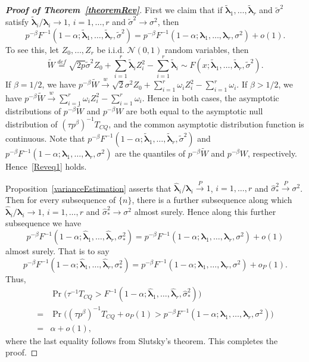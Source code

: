 \documentclass[times,sort&compress,3p]{elsarticle}
\newcommand{\bfsym}[1]{\ensuremath{\boldsymbol{#1}}}
\def\blambda {\bfsym {\lambda}}        \def\bLambda {\bfsym {\Lambda}}
\theoremstyle{plain}
\theoremstyle{definition}
\theoremstyle{remark}
\begin{document}
\begin{appendices}
\begin{proof}[\textbf{Proof of Theorem~\ref{theoremRev}}]
    First we claim that if $\tilde{\blambda}_1,\ldots, \tilde{\blambda}_r$ and $\tilde{\sigma}^2$ satisfy $\tilde{\blambda}_i/\blambda_i\to 1$, $i=1,\ldots,r$ and $\tilde{\sigma}^2\to \sigma^2$, then
    \begin{equation}\label{Reveq1}
        p^{-\beta}F^{-1}(1-\alpha;\tilde{\blambda}_1,\ldots,\tilde{\blambda}_r,\tilde{\sigma}^2)=
        p^{-\beta}F^{-1}(1-\alpha;\blambda_1,\ldots,\blambda_r,\sigma^2)+o(1).
    \end{equation}
    To see this, let $Z_0,\ldots, Z_r$ be i.i.d. $\mathcal{N}(0,1)$ random variables, then
    $$
    \tilde{W}\overset{def}{=}\sqrt{2p}\tilde{\sigma}^2 Z_0
+
        \sum_{i=1}^r \tilde{\blambda}_i Z_i^2
            -
        \sum_{i=1}^r \tilde{\blambda}_i\sim F(x;\tilde{\blambda}_1,\ldots,\tilde{\blambda}_r,\tilde{\sigma}^2).
    $$
If $\beta=1/2$, we have
$
    p^{-\beta}\tilde{W}\xrightarrow{w}
\sqrt{2}\sigma^2 Z_0 + \sum_{i=1}^r \omega_i Z_i^2 -\sum_{i=1}^r \omega_i
$.
If $\beta>1/2$, we have
$
    p^{-\beta}\tilde{W}\xrightarrow{w}
\sum_{i=1}^r \omega_i Z_i^2 -\sum_{i=1}^r \omega_i.
$
    Hence in both cases, the asymptotic distributions of $p^{-\beta}\tilde{W}$ and $p^{-\beta}W$ are both equal to the asymptotic null distribution of $(\tau p^{\beta})^{-1}T_{CQ}$, and the common asymptotic distribution function is continuous.
Note that
$
        p^{-\beta}F^{-1}(1-\alpha;\tilde{\blambda}_1,\ldots,\tilde{\blambda}_r,\tilde{\sigma}^2)
    $
     and
$
        p^{-\beta}F^{-1}(1-\alpha;\blambda_1,\ldots,\blambda_r,\sigma^2)
    $
    are the quantiles of $p^{-\beta}\tilde{W}$ and $p^{-\beta}W$, respectively.
    Hence~\eqref{Reveq1} holds. 
    
    Proposition~\ref{varianceEstimation} asserts that $\hat{\blambda}_i/\blambda_i\xrightarrow{P} 1$, $i=1,\ldots,r$ and $\hat{\sigma}_*^2\xrightarrow{P} \sigma^2$.
    Then for every subsequence of $\{n\}$, there is a further subsequence along which $\hat{\blambda}_i/\blambda_i\to 1$, $i=1,\ldots,r$ and $\hat{\sigma}_*^2\to \sigma^2$ almost surely.
    Hence along this further subsequence we have
    $$
        p^{-\beta}F^{-1}(1-\alpha;\hat{\blambda}_1,\ldots,\hat{\blambda}_r,\sigma_{*}^2)=
        p^{-\beta}F^{-1}(1-\alpha;\blambda_1,\ldots,\blambda_r,\sigma^2)+o(1)
    $$
    almost surely.
    That is to say
    $$
        p^{-\beta}F^{-1}(1-\alpha;\hat{\blambda}_1,\ldots,\hat{\blambda}_r,\sigma_{*}^2)=
        p^{-\beta}F^{-1}(1-\alpha;\blambda_1,\ldots,\blambda_r,\sigma^2)+o_P(1).
    $$
    Thus,
    $$
    \begin{aligned}
        &\Pr\big(\tau^{-1}T_{CQ} > F^{-1}(1-\alpha;\hat{\blambda}_1,\ldots,\hat{\blambda}_r,\hat{\sigma}_*^2)\big)
        \\
        =&
    \Pr\big((\tau p^{\beta})^{-1}T_{CQ} +o_P(1) > p^{-\beta}F^{-1}(1-\alpha;\blambda_1,\ldots,\blambda_r,\sigma^2)\big)
        \\
        =& \alpha +o(1),
    \end{aligned}
    $$
    where the last equality follows from Slutsky's theorem.
    This completes the proof.
\end{proof}





\end{appendices}
\end{document}
